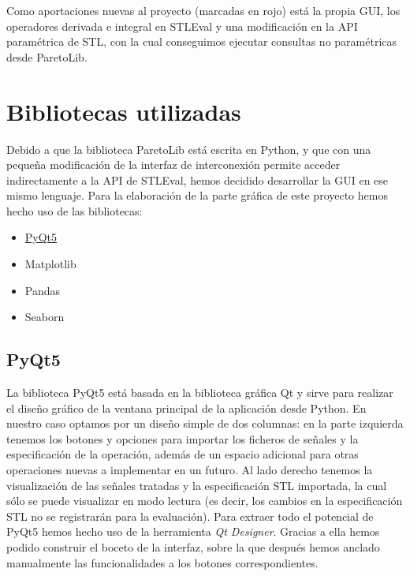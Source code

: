 Como aportaciones nuevas al proyecto (marcadas en rojo) está la propia GUI, los operadores derivada e integral en STLEval y una modificación en la API paramétrica de STL, con la cual conseguimos ejecutar consultas no paramétricas desde ParetoLib.

\section{Bibliotecas utilizadas}

Debido a que la biblioteca ParetoLib está escrita en Python, y que con una pequeña modificación de la interfaz de interconexión permite acceder indirectamente a la API de STLEval, hemos decidido desarrollar la GUI en ese mismo lenguaje. Para la elaboración de la parte gráfica de este proyecto hemos hecho uso de las bibliotecas:
\begin{itemize}
\item \href{https://www.qt.io/qt-for-python}{PyQt5}
\item Matplotlib
\item Pandas
\item Seaborn
\end{itemize}
 
\subsection{PyQt5}
La biblioteca PyQt5 está basada en la biblioteca gráfica Qt y sirve para realizar el diseño gráfico de la ventana principal de la aplicación desde Python. En nuestro caso optamos por un diseño simple de dos columnas: en la parte izquierda tenemos los botones y opciones para importar los ficheros de señales y la especificación de la operación, además de un espacio adicional para otras operaciones nuevas a implementar en un futuro. Al lado derecho tenemos la visualización de las señales tratadas y la especificación STL importada, la cual sólo se puede visualizar en modo lectura (es decir, los cambios en la especificación STL no se registrarán para la evaluación). Para extraer todo el potencial de PyQt5 hemos hecho uso de la herramienta \textit{Qt Designer}. Gracias a ella hemos podido construir el boceto de la interfaz, sobre la que después hemos anclado manualmente las funcionalidades a los botones correspondientes.

